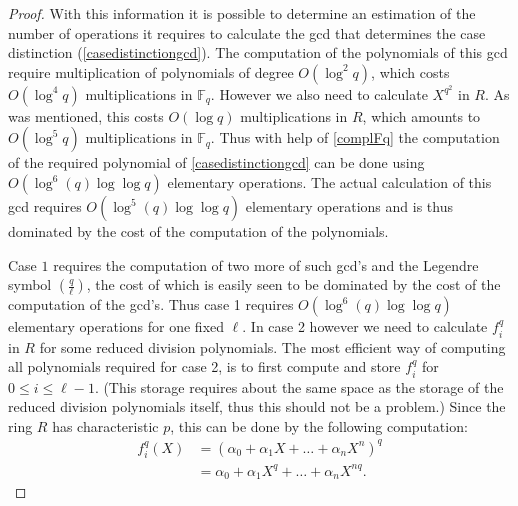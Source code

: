 \documentclass{article}
\numberwithin{equation}{section}
\theoremstyle{definition}
\newcommand{\FF}[1]{{\mathbb F}_{#1}} %
\newcommand{\leg}[2]{\left( \frac{#1}{#2}\right)} %
\begin{document}
\begin{proof}
With this information it is possible to determine an estimation of the number of operations it requires to calculate the gcd that determines the case distinction (\ref{casedistinctiongcd}).
The computation of the polynomials of this gcd require multiplication of polynomials of degree $O(\log ^2 q)$, which costs $O(\log ^4 q)$ multiplications in $\FF{q}$. However we also need to calculate $X^{q^2}$ in $R$. As was mentioned, this costs $O(\log q)$ multiplications in $R$, which amounts to $O(\log ^5 q)$ multiplications in $\FF{q}$. Thus with help of \ref{complFq} the computation of the required polynomial of \ref{casedistinctiongcd} can be done using $O(\log^6 (q) \log \log q)$ elementary operations. The actual calculation of this gcd requires $O(\log^5 (q) \log \log q)$ elementary operations and is thus dominated by the cost of the computation of the polynomials. \par
Case $1$ requires the computation of two more of such gcd's and the Legendre symbol $\leg{q}{\ell}$, the cost of which is easily seen to be dominated by the cost of the computation of the gcd's. Thus case 1 requires $O(\log ^6 (q) \log \log q)$ elementary operations for one fixed $\ell$. 
In case 2 however we need to calculate $f_i^q$ in $R$ for some reduced division polynomials. The most efficient way of computing all polynomials required for case 2, is to first compute and store $f_i^q$ for $0 \leq i  \leq \ell-1$. (This storage requires about the same space as the storage of the reduced division polynomials itself, thus this should not be a problem.) Since the ring $R$ has characteristic $p$, this can be done by the following computation:
\begin{align*}
f_i^q(X) &= (\alpha_0 + \alpha_1X+\ldots + \alpha_nX^n)^q\\
&= \alpha_0+\alpha_1X^q+\ldots + \alpha_n X^{nq}.
\end{align*}

\end{proof}
\end{document}
